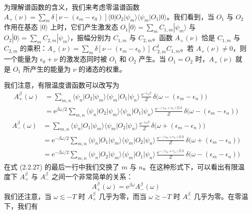 为理解谱函数的含义，我们来考虑零温谱函数 $A_{+}(\nu) \allowbreak= \sum_m \delta[\nu - (\epsilon_m - \epsilon_0)]\allowbreak\langle 0|O_2|\psi_m\rangle\allowbreak\langle\psi_m|O_1|0\rangle$。我们看到，当 $O_1$ 与 $O_2$ 作用在基态 $|0\rangle$ 上时，它们产生激发态 $O_1|0\rangle = \sum_m C_{1,m}|\psi_m\rangle$ 与 $O_2|0\rangle = \sum_m C_{2,m}|\psi_m\rangle$，振幅分别为 $C_{1,m}$ 与 $C_{2,m}$。函数 $A_{+}(\nu)$ 恰是 $C_{1,m}$ 与 $C_{2,m}$ 的乘积：$A_{+}(\nu) = \sum_m \delta[\nu - (\epsilon_m - \epsilon_0)]\, C^{\dagger}_{2,m}C_{1,m}$。若 $A_{+}(\nu) \neq 0$，则一个能量为 $\epsilon_0 + \nu$ 的激发态同时被 $O_1$ 和 $O_2$ 产生。当 $O_1 = O_2$ 时，$A_{+}(\nu)$ 就是 $O_1$ 所产生的能量为 $\nu$ 的诸态的权重。

我们注意，有限温度谱函数可以改写为
\begin{align*}
A^{\beta}_{+}(\omega) &= \sum_{m,n} \langle\psi_n|O_2|\psi_m\rangle\langle\psi_m|O_1|\psi_n\rangle\, \frac{\mathrm{e}^{-\epsilon_n\beta}}{Z}\, \delta\bigl(\omega - (\epsilon_m - \epsilon_n)\bigr)
\\
&= \mathrm{e}^{\beta\omega/2} \sum_{m,n} \langle\psi_n|O_2|\psi_m\rangle\langle\psi_m|O_1|\psi_n\rangle\, \frac{\mathrm{e}^{-(\epsilon_m + \epsilon_n)\beta/2}}{Z}\, \delta\bigl(\omega - (\epsilon_m - \epsilon_n)\bigr) \tag{2.2.26}
\end{align*}
\begin{align*}
A^{\beta}_{-}(\omega) &= \sum_{m,n} \langle\psi_n|O_1|\psi_m\rangle\langle\psi_m|O_2|\psi_n\rangle\, \frac{\mathrm{e}^{-\epsilon_n\beta}}{Z}\, \delta\bigl(\omega + (\epsilon_m - \epsilon_n)\bigr) \tag{2.2.27}
\\
&= \mathrm{e}^{-\beta\omega/2} \sum_{m,n} \langle\psi_n|O_1|\psi_m\rangle\langle\psi_m|O_2|\psi_n\rangle\, \frac{\mathrm{e}^{-(\epsilon_m + \epsilon_n)\beta/2}}{Z}\, \delta\bigl(\omega + (\epsilon_m - \epsilon_n)\bigr)
\\
&= \mathrm{e}^{-\beta\omega/2} \sum_{m,n} \langle\psi_n|O_2|\psi_m\rangle\langle\psi_m|O_1|\psi_n\rangle\, \frac{\mathrm{e}^{-(\epsilon_m + \epsilon_n)\beta/2}}{Z}\, \delta\bigl(\omega - (\epsilon_m - \epsilon_n)\bigr)
\end{align*}
在式 (2.2.27) 的最后一行中我们交换了 $m$ 与 $n$。在这种形式下，可以看出有限温度下 $A^{\beta}_{+}$ 与 $A^{\beta}_{-}$ 之间一个非常简单的关系：
\begin{equation*}
\boxed{\; A^{\beta}_{+}(\omega) = \mathrm{e}^{\beta\omega} A^{\beta}_{-}(\omega) \;} \tag{2.2.28}
\end{equation*}
我们还注意，当 $\omega \lesssim -T$ 时 $A^{\beta}_{+}$ 几乎为零，而当 $\omega \gtrsim -T$ 时 $A^{\beta}_{-}$ 几乎为零。在零温下，我们有
